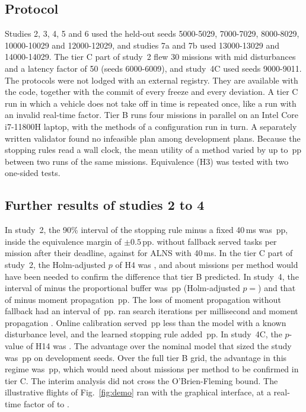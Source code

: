\subsection{Protocol}
Studies 2, 3, 4, 5 and 6 used the held-out seeds 5000-5029, 7000-7029, 8000-8029, 10000-10029 and 12000-12029,
and studies 7a and 7b used 13000-13029 and 14000-14029. The tier C part of study~2 flew 30 missions with mid
disturbances and a latency factor of 50 (seeds 6000-6009), and study~4C used seeds 9000-9011. The protocols were not
lodged with an external registry. They are available with the code, together with the commit of every freeze and every
deviation. A tier C run in which a vehicle does not take off in time is repeated once, like a run with an invalid
real-time factor. Tier B runs four missions in parallel on an Intel Core i7-11800H laptop, with the methods of a
configuration run in turn. A separately written validator found no infeasible plan among 
development plans. Because the stopping rules read a wall clock, the mean utility of a method varied by up to
\,pp between two runs of the same missions. Equivalence (H3) was tested with two one-sided tests.

\subsection{Further results of studies 2 to 4}
In study~2, the 90\% interval of the stopping rule minus a fixed 40\,ms was \,pp, inside the
equivalence margin of $\pm0.5$\,pp. \mname{} without fallback served  tasks per mission after their
deadline, against  for ALNS with 40\,ms. In the tier C part of study~2, the Holm-adjusted $p$ of H4 was
, and about  missions per method would have been needed to confirm the difference that
tier B predicted. In study~4, the interval of \mname{} minus the proportional buffer was \,pp
(Holm-adjusted $p={}$) and that of \mname{} minus moment propagation \,pp. The loss of
moment propagation without fallback had an interval of \,pp. \mname{} ran  search iterations per millisecond and
moment propagation . Online calibration served \,pp less than the model with a known
disturbance level, and the learned stopping rule added \,pp. In study~4C, the $p$-value of H14 was
. The advantage over the nominal model that sized the study was \,pp on development seeds.
Over the full tier B grid, the advantage in this regime was \,pp, which would need about
 missions per method to be confirmed in tier C. The interim analysis did not cross the
O'Brien-Fleming bound. The illustrative flights of Fig.~\ref{fig:demo} ran with the graphical interface, at a
real-time factor of  to .

